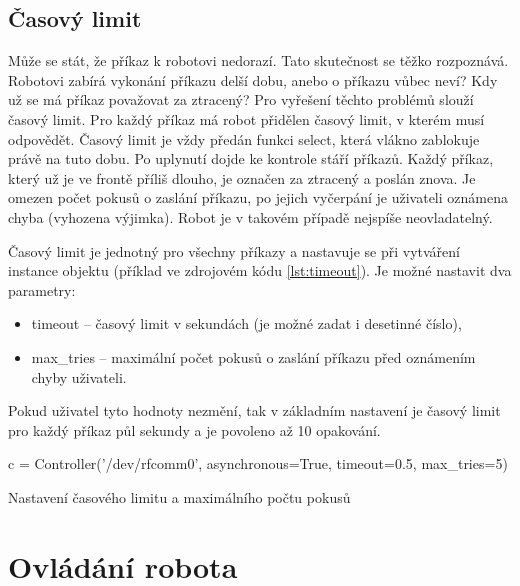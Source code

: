     \subsection{Časový limit}

    Může se stát, že příkaz k robotovi nedorazí. Tato skutečnost se těžko
    rozpoznává. Robotovi zabírá vykonání příkazu delší dobu, anebo o příkazu
    vůbec neví? Kdy už se má příkaz považovat za ztracený? Pro vyřešení těchto
    problémů slouží časový limit. Pro každý příkaz má robot přidělen časový
    limit, v kterém musí odpovědět. Časový limit je vždy předán funkci select,
    která vlákno zablokuje právě na tuto dobu. Po uplynutí dojde ke kontrole
    stáří příkazů. Každý příkaz, který už je ve frontě příliš dlouho, je
    označen za ztracený a poslán znova. Je omezen počet pokusů o zaslání
    příkazu, po jejich vyčerpání je uživateli oznámena chyba (vyhozena
    výjimka). Robot je v takovém případě nejspíše neovladatelný.

    Časový limit je jednotný pro všechny příkazy a nastavuje se při vytváření
    instance objektu  (příklad ve zdrojovém kódu
    \ref{lst:timeout}). Je možné nastavit dva parametry:

    \begin{itemize}
        \item timeout -- časový limit v sekundách (je možné zadat i desetinné číslo),
        \item max\_tries -- maximální počet pokusů o zaslání příkazu před
        oznámením chyby uživateli.
    \end{itemize}

    Pokud uživatel tyto hodnoty nezmění, tak v základním nastavení je časový
    limit pro každý příkaz půl sekundy a je povoleno až 10 opakování.

    \begin{listing}
        \begin{pyc}
c = Controller('/dev/rfcomm0',
               asynchronous=True,
               timeout=0.5,
               max_tries=5)
        \end{pyc}
        \caption{Nastavení časového limitu a maximálního počtu pokusů}
        \label{lst:timeout}
    \end{listing}

    \section{Ovládání robota}
    \label{controller}

